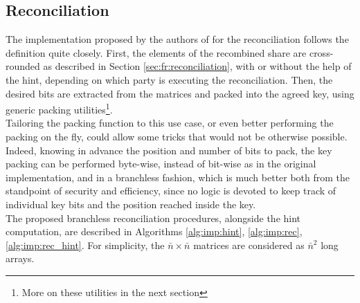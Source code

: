 \subsection{Reconciliation}\label{sec:imp:rec}
The implementation proposed by the authors of \cite{frodo} for the reconciliation follows the definition quite closely. First, the elements of the recombined share are cross-rounded as described in Section \ref{sec:fr:reconciliation}, with or without the help of the hint, depending on which party is executing the reconciliation. Then, the desired bits are extracted from the matrices and packed into the agreed key, using generic packing utilities\footnote{More on these utilities in the next section}.\\
Tailoring the packing function to this use case, or even better performing the packing on the fly, could allow some tricks that would not be otherwise possible. Indeed, knowing in advance the position and number of bits to pack, the key packing can be performed byte-wise, instead of bit-wise as in the original implementation, and in a branchless fashion, which is much better both from the standpoint of security and efficiency, since no logic is devoted to keep track of individual key bits and the position reached inside the key.\\
The proposed branchless reconciliation procedures, alongside the hint computation, are described in Algorithms \ref{alg:imp:hint}, \ref{alg:imp:rec}, \ref{alg:imp:rec_hint}. For simplicity, the $\bar{n}\times\bar{n}$ matrices are considered as $\bar{n}^2$ long arrays.

